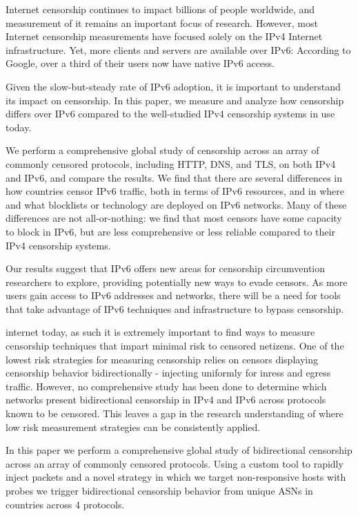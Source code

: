 
Internet censorship continues to impact billions of people worldwide,
and measurement of it remains an important focus of research.
However, most Internet censorship measurements have focused solely on the IPv4
Internet infrastructure. Yet, more clients and servers are available over IPv6:
According to Google, over a third of their users now have native IPv6 access.

Given the slow-but-steady rate of IPv6 adoption, it is important to understand
its impact on censorship. In this paper, we measure and analyze how censorship
differs over IPv6 compared to the well-studied IPv4 censorship systems in use
today.

We perform a comprehensive global study of censorship across an array of
commonly censored protocols, including HTTP, DNS, and TLS, on both IPv4
and IPv6, and compare the results.
We find that there are several differences in how countries censor IPv6 traffic,
both in terms of IPv6 resources, and in where and what blocklists or technology
are deployed on IPv6 networks. Many of these differences are
not all-or-nothing: we find that most censors have some capacity to block
in IPv6, but are less comprehensive or less reliable compared to their IPv4
censorship systems.

Our results suggest that IPv6 offers new areas for censorship circumvention
researchers to explore, providing potentially new ways to evade censors. As more
users gain access to IPv6 addresses and networks, there will be a need for tools
that take advantage of IPv6 techniques and infrastructure to bypass censorship.



 internet today, as such
it is extremely important to find ways to measure censorship techniques that impart
minimal risk to censored netizens. One of the lowest risk strategies for measuring
censorship relies on censors displaying censorship behavior bidirectionally -
injecting uniformly for inress and egress traffic. However, no comprehensive
study has been done to determine which networks present bidirectional censorship
in IPv4 and IPv6 across protocols known to be censored. This leaves a gap in the
research understanding of where low risk measurement strategies can be
consistently applied.

In this paper we perform a comprehensive global study of bidirectional
censorship across an array of commonly censored protocols. Using a custom tool
to rapidly inject packets and a novel strategy in which we target non-responsive
hosts with probes we trigger bidirectional censorship behavior from
 unique ASNs in  countries across 4 protocols.

